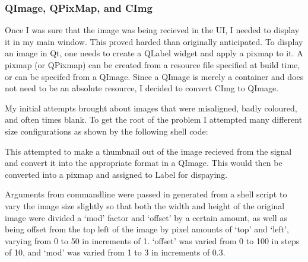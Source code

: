 {{\subsubsection{QImage, QPixMap, and CImg}
Once I was sure that the image was being recieved in the UI, I needed to display it in my main window. This proved harded than originally anticipated. To display an image in Qt, one needs to create a QLabel widget and apply a pixmap to it. A pixmap (or QPixmap) can be created from a resource file specified at build time, or can be specifed from a QImage. Since a QImage is merely a container and does not need to be an absolute resource, I decided to convert CImg to QImage. 

My initial attempts brought about images that were misaligned, badly coloured, and often times blank. To get the root of the problem I attempted many different size configurations as shown by the following shell code:
\pagebreak
\begin{frame}{}
	\vspace{-20pt}
	
	\label{code:shell1}
\end{frame}
This attempted to make a thumbnail out of the image recieved from the signal and convert it into the appropriate format in a QImage. This would then be converted into a pixmap and assigned to Label for dispaying.

Arguments from commandline were passed in generated from a shell script to vary the image size slightly so that both the width and height of the original image were divided a ‘mod’ factor and ‘offset’ by a certain amount, as well as being offset from the top left of the image by pixel amounts of ‘top’ and ‘left’, varying from 0 to 50 in increments of 1. ‘offset’ was varied from 0 to 100 in steps of 10, and ‘mod’ was varied from 1 to 3 in increments of 0.3.

}}
